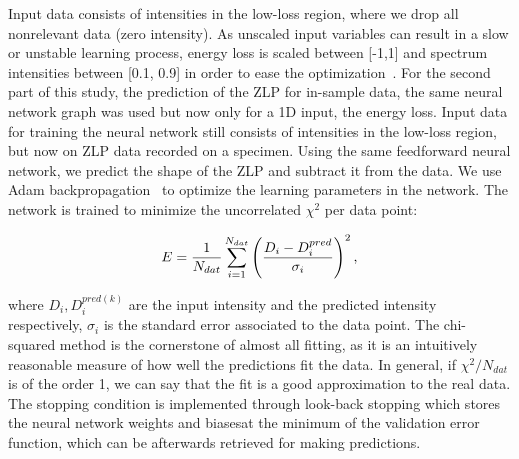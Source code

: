 %
Input data consists of intensities in the low-loss region, 
where we drop all nonrelevant data (zero intensity). As unscaled input variables
can result in a slow or unstable learning process,
energy loss is scaled between [-1,1] and spectrum intensities between [0.1, 0.9]
in order to ease the optimization~\cite{Ball:2008by}.
%
For the second part of this study, the prediction of the ZLP for in-sample data,
the same neural network graph was used but now only for a 1D input, the energy loss. 
%
Input data for training the neural network still consists of intensities in the low-loss region, 
but now on ZLP data recorded on a specimen. Using the same feedforward neural network,
we predict the shape of the ZLP and subtract it from the data.
%
We use Adam backpropagation~\cite{Kingma:2017} to optimize the learning parameters in the network. 
The network is trained to minimize the uncorrelated $\chi^2$ per data point:

\begin{equation}\label{eq:chi2}
\begin{centering}
    E = \frac{1}{N_{dat}}\sum_{i=1}^{N_{dat}}\left(\frac{D_i - D_i^{pred}}{\sigma_i}\right)^2, 
\end{centering}
\end{equation}

where $D_i, D_i^{pred(k)}$ are the input intensity and the predicted 
intensity respectively,
$\sigma_i$ is the standard error associated to the data point. 
%
The chi-squared method is the cornerstone of almost all fitting, as it is 
an intuitively reasonable measure of how well the predictions fit the data.
In general, if $\chi^2/N_{dat}$ is of the order 1, we can say that the fit is a 
good approximation to the real data. \\
%
The stopping condition is implemented through look-back stopping which stores 
the neural network weights and biasesat the minimum of the validation error function,  
which can be afterwards retrieved for 
making predictions.
%

